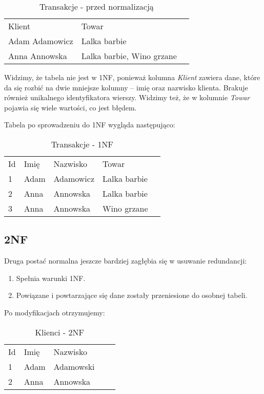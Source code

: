 \begin{table}[H]
\centering
\caption{Transakcje - przed normalizacją}
\begin{tabular}{|l|l|l}
\cline{1-2}
Klient         & Towar          & \\ \cline{1-2}
Adam Adamowicz & Lalka barbie   & \\ \cline{1-2}
Anna Annowska  & Lalka barbie, Wino grzane &  \\ \cline{1-2}
\end{tabular}
\end{table}

Widzimy, że tabela nie jest w 1NF, ponieważ kolumna \textit{Klient} zawiera dane, które da się rozbić na dwie mniejsze kolumny -- imię oraz nazwisko klienta.
Brakuje również unikalnego identyfikatora wierszy.
Widzimy też, że w kolumnie \textit{Towar} pojawia się wiele wartości, co jest błędem.

Tabela po sprowadzeniu do 1NF wygląda następująco:
\begin{table}[H]
\centering
\caption{Transakcje - 1NF}
\begin{tabular}{|l|l|l|l|l}
\cline{1-4}
Id & Imię & Nazwisko  & Towar          & \\ \cline{1-4}
1  & Adam & Adamowicz & Lalka barbie   & \\ \cline{1-4}
2  & Anna & Annowska  & Lalka barbie   & \\ \cline{1-4}
3  & Anna & Annowska  & Wino grzane    & \\ \cline{1-4}
\end{tabular}
\end{table}

\subsection*{2NF}
	Druga postać normalna jeszcze bardziej zagłębia się w usuwanie redundancji:
\begin{enumerate}
	\item{Spełnia warunki 1NF.}
	\item{Powiązane i powtarzające się dane zostały przeniesione do osobnej tabeli.}
\end{enumerate}

Po modyfikacjach otrzymujemy:

\begin{table}[H]
\centering
\caption{Klienci - 2NF}
\begin{tabular}{|l|l|l|ll}
\cline{1-3}
Id & Imię & Nazwisko  &  &  \\ \cline{1-3}
1  & Adam & Adamowski &  &  \\ \cline{1-3}
2  & Anna & Annowska  &  &  \\ \cline{1-3}
\end{tabular}
\end{table}

